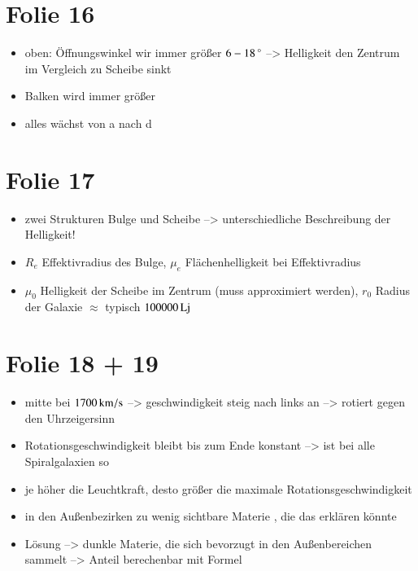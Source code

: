 \section{Folie 16}

\begin{itemize}
\item oben: Öffnungswinkel wir immer größer $\unit[6-18]{^\circ}$ --> Helligkeit den Zentrum im Vergleich zu Scheibe sinkt
\item Balken wird immer größer 
\item alles wächst von a nach d
\end{itemize}



\section{Folie 17}

\begin{itemize}
\item zwei Strukturen Bulge und Scheibe --> unterschiedliche Beschreibung der Helligkeit!
\item $R_e$ Effektivradius des Bulge, $\mu_e$ Flächenhelligkeit bei Effektivradius
\item $\mu_0$ Helligkeit der Scheibe im Zentrum (muss approximiert werden), $r_0$ Radius der Galaxie $\approx$ typisch $\unit[100000]{Lj}$
\end{itemize}


\newpage

\section{Folie 18 + 19}

\begin{itemize}
\item mitte bei $\unit[1700]{km/s}$ --> geschwindigkeit steig nach links an --> rotiert gegen den Uhrzeigersinn
\item Rotationsgeschwindigkeit bleibt bis zum Ende konstant --> ist bei alle Spiralgalaxien so
\item je höher die Leuchtkraft, desto größer die maximale Rotationsgeschwindigkeit
\item in den Außenbezirken zu wenig sichtbare Materie , die das erklären könnte
\item Lösung --> dunkle Materie, die sich bevorzugt in den Außenbereichen sammelt --> Anteil berechenbar mit Formel
\end{itemize}


